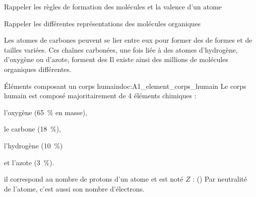 \teteTermStssOrga
\vspace*{-30pt}

\begin{objectifs}
  \item Rappeler les règles de formation des molécules et la valence d'un atome
  \item Rappeler les différentes représentations des molécules organiques
\end{objectifs}

\begin{contexte}
  Les atomes de carbones peuvent se lier entre eux pour former des  de formes et de tailles variées.
  Ces chaînes carbonées, une fois liée à des atomes d'hydrogène, d'oxygène ou d'azote, forment des 
  Il existe ainsi des millions de molécules organiques différentes.

\end{contexte}


\vspace*{-8pt}
\vspace*{-8pt}

\begin{doc}{Éléments composant un corps humain}{doc:A1_element_corps_humain}
  Le corps humain est composé majoritairement de 4 éléments chimiques :
  \vspace*{-4pt}
  \begin{listePoints}[2]
    \item l'oxygène   \oxygene (\qty{65}{\percent} en masse),
    \item le carbone  \carbone (\qty{18}{\percent}),
    \item l'hydrogène \hydrogene (\qty{10}{\percent})
    \item et l'azote   (\qty{3}{\percent}).
  \end{listePoints}
  
  \begin{importants}
     il correspond au nombre de protons d'un atome et est noté $Z$ :  (\hspace{-8pt}\exemple {})
    Par neutralité de l'atome, c'est aussi son nombre d'électrons.
  \end{importants}
\end{doc}

